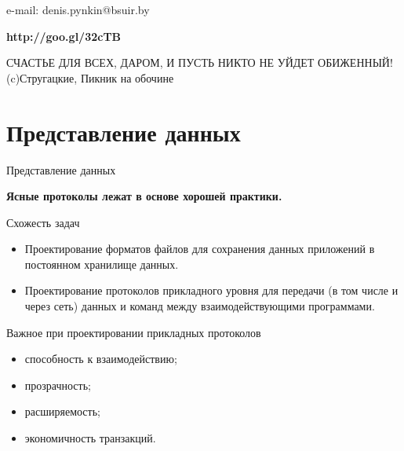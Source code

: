 

\subtitle{Форматы данных \\и проектирование пользовательских протоколов}

%
%

\begin{frame}
\titlepage
\begin{center}
e-mail: denis.pynkin@bsuir.by\\
\end{center}
\begin{center}
{\bfseries http://goo.gl/32cTB}

{\tiny СЧАСТЬЕ ДЛЯ ВСЕХ, ДАРОМ, И ПУСТЬ НИКТО НЕ УЙДЕТ ОБИЖЕННЫЙ!\\
(c)Стругацкие, Пикник на обочине}
\end{center}
\end{frame}

\section{Представление данных}

\begin{frame}{Представление данных}
	\begin{center}
	{\Large\bfseries Ясные протоколы лежат в основе хорошей практики.}
	\end{center}
\end{frame}

\begin{frame}{Схожесть задач}
	\begin{itemize}
		\item Проектирование форматов файлов для сохранения данных приложений в постоянном хранилище данных.
		\item Проектирование протоколов прикладного уровня для передачи (в том числе и через сеть) данных и команд между взаимодействующими программами.
	\end{itemize}
\end{frame}

\begin{frame}{Важное при проектировании прикладных протоколов}
	\begin{itemize}
		\item способность к взаимодействию; 
			\pause
		\item прозрачность;
			\pause
		\item расширяемость;
			\pause
		\item экономичность транзакций.
	\end{itemize}
\end{frame}


